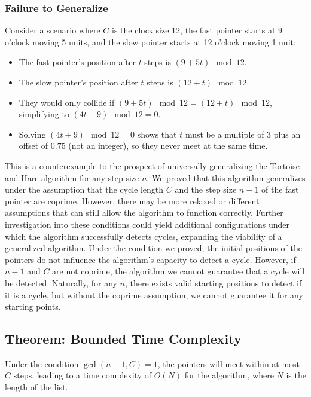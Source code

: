 \documentclass{article}
\begin{document}
\subsubsection*{Failure to Generalize}
Consider a scenario where \( C \) is the clock size 12, the fast pointer starts at 9 o'clock moving 5 units, and the slow pointer starts at 12 o'clock moving 1 unit:
\begin{itemize}
    \item The fast pointer's position after \( t \) steps is \( (9 + 5t) \mod 12 \).
    \item The slow pointer's position after \( t \) steps is \( (12 + t) \mod 12 \).
    \item They would only collide if \( (9 + 5t) \mod 12 = (12 + t) \mod 12 \), simplifying to \( (4t + 9) \mod 12 = 0 \).
    \item Solving \( (4t + 9) \mod 12 = 0 \) shows that \( t \) must be a multiple of 3 plus an offset of \( 0.75 \) (not an integer), so they never meet at the same time.
\end{itemize}
This is a counterexample to the prospect of universally generalizing the Tortoise and Hare algorithm for any step size \( n \). We proved that this algorithm generalizes under the assumption that the cycle length \( C \) and the step size \( n-1 \) of the fast pointer are coprime. However, there may be more relaxed or different assumptions that can still allow the algorithm to function correctly. Further investigation into these conditions could yield additional configurations under which the algorithm successfully detects cycles, expanding the viability of a generalized algorithm. Under the condition we proved, the initial positions of the pointers do not influence the algorithm’s capacity to detect a cycle. However, if \( n-1 \) and \( C \) are not coprime, the algorithm we cannot guarantee that a cycle will be detected. Naturally, for any $n$, there exists valid starting positions to detect if it is a cycle, but without the coprime assumption, we cannot guarantee it for any starting points.

\subsection{Theorem: Bounded Time Complexity}
\begin{theorem}
Under the condition \( \gcd(n - 1, C) = 1 \), the pointers will meet within at most \( C \) steps, leading to a time complexity of \( O(N) \) for the algorithm, where \( N \) is the length of the list.
\end{theorem}
\end{document}
